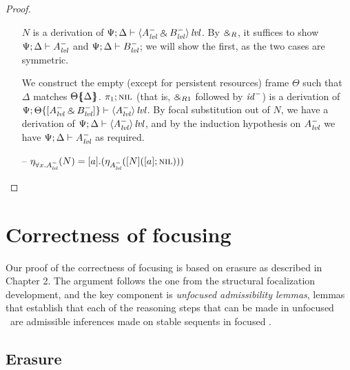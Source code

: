 \begin{proof}
\begin{itemize}
$N$ is a derivation of 
$\foc{\Psi}{\Delta}{\islvl{\susp{A^-_\mlvl \with B^-_\mlvl}}}$. By 
$\with_R$, it suffices to show $\foc{\Psi}{\Delta}{A^-_\mlvl}$
and $\foc{\Psi}{\Delta}{B^-_\mlvl}$; we will show the first, as the two
cases are symmetric.
\smallskip

We construct the empty (except for persistent resources) frame
$\Theta$ such that $\Delta$ matches $\frameoff{\Theta}{\Delta}$. 
$\tpione{\tnil}$ (that is, ${\with}_{R1}$ followed by ${\it id}^-$) is
a derivation of 
$\foc{\Psi}{\tackon{\Theta}{[A^-_\mlvl \with B^-_\mlvl]}}
  {\islvl{\susp{A^-_\mlvl}}}$.
By focal substitution out of $N$, we have 
a derivation of $\foc{\Psi}{\Delta}{\islvl{\susp{A^-_\mlvl}}}$, and
by the induction 
hypothesis on $A^-_\mlvl$ we have 
 $\foc{\Psi}{\Delta}{A^-_\mlvl}$ as required.
\smallskip

\item[--] $\etana{N}{\forall x.A^-_\mlvl}
           = \tforallr{a}{(\etana{[N](\tforalll{a}{\tnil})}{A^-_\mlvl})}$

\end{itemize}

\end{proof}

\section{Correctness of focusing}
\label{sec:ord-correctness}

Our proof of the correctness of focusing is based on erasure as
described in Chapter 2. The argument follows the one from the
structural focalization development, and the key component is {\it
  unfocused admissibility lemmas}, lemmas that establish that each of
the reasoning steps that can be made in unfocused \ollll~are
admissible inferences made on stable sequents in focused \ollll.



\subsection{Erasure}

